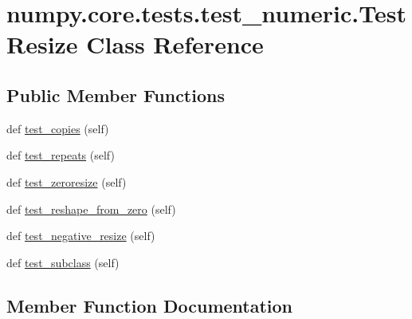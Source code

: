 \hypertarget{classnumpy_1_1core_1_1tests_1_1test__numeric_1_1TestResize}{}\section{numpy.\+core.\+tests.\+test\+\_\+numeric.\+Test\+Resize Class Reference}
\label{classnumpy_1_1core_1_1tests_1_1test__numeric_1_1TestResize}
\subsection*{Public Member Functions}
\begin{DoxyCompactItemize}
\item 
def \hyperlink{classnumpy_1_1core_1_1tests_1_1test__numeric_1_1TestResize_aacade7e5082ac9d9cbac46baea97fa04}{test\+\_\+copies} (self)
\item 
def \hyperlink{classnumpy_1_1core_1_1tests_1_1test__numeric_1_1TestResize_a02fa29c41341ad460410e7c212e107ca}{test\+\_\+repeats} (self)
\item 
def \hyperlink{classnumpy_1_1core_1_1tests_1_1test__numeric_1_1TestResize_a419ed15bedc9fec8974c59ee6684d009}{test\+\_\+zeroresize} (self)
\item 
def \hyperlink{classnumpy_1_1core_1_1tests_1_1test__numeric_1_1TestResize_aa53bf8ed46e100759122b9db180f5887}{test\+\_\+reshape\+\_\+from\+\_\+zero} (self)
\item 
def \hyperlink{classnumpy_1_1core_1_1tests_1_1test__numeric_1_1TestResize_a1f20570066a07a51724ca46ab33662ae}{test\+\_\+negative\+\_\+resize} (self)
\item 
def \hyperlink{classnumpy_1_1core_1_1tests_1_1test__numeric_1_1TestResize_a5ed6252a92a2279b6afc07364970f92f}{test\+\_\+subclass} (self)
\end{DoxyCompactItemize}


\subsection{Member Function Documentation}
\mbox{\label{classnumpy_1_1core_1_1tests_1_1test__numeric_1_1TestResize_aacade7e5082ac9d9cbac46baea97fa04}} 
